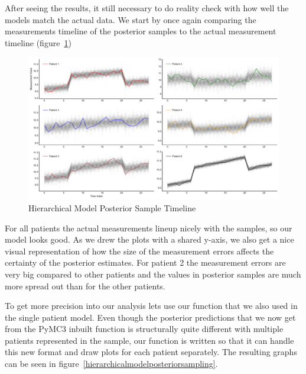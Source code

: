 \documentclass[12pt,a4paper,leqno]{report}
\theoremstyle{plain}
\theoremstyle{definition}
\theoremstyle{remark}
\begin{document}
After seeing the results, it still necessary to do reality check with how well the
models match the actual data. We start by once again comparing the measurements timeline
of the posterior samples to the actual measurement timeline (figure\ \ref{hierarhicalmodelposteriortimeline})

\bigskip
\begin{figure}[H]
    \caption{Hierarchical Model Posterior Sample Timeline}\label{hierarhicalmodelposteriortimeline}
    \bigskip
    \includegraphics[width=\textwidth,height=\textheight,keepaspectratio]{posterior_sample_timeline_hierarchical_model.pdf}
\end{figure}
\bigskip

For all patients the actual measurements lineup nicely with the samples, so our model
looks good. As we drew the plots with a shared y-axis, we also get a nice visual
representation of how the size of the measurement errors
affects the certainty of the posterior estimates. For patient 2 the measurement errors are
very big compared to other patients and the values in posterior samples
are much more spread out than for the other patients.

To get more precision into our analysis lets use our 
function that we also used in the single patient model. Even though the posterior
predictions that we now get from the PyMC3 inbuilt
 function is structurally quite different with
multiple patients represented in the sample, our function is written
so that it can handle this new format and draw plots for each patient separately. The
resulting graphs can be seen in figure\ \ref{hierarchicalmodelposteriorsampling}.
\end{document}

